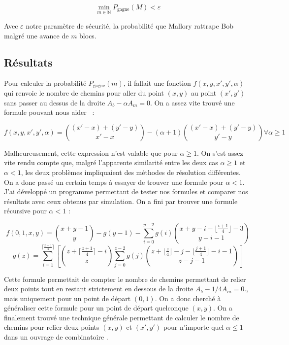 	\begin{equation}\label{eq:min-m}
		\min_{m \in \mathbb{N}} P_{\text{gagne}}(M) < \varepsilon
	\end{equation}

	Avec $\varepsilon$ notre paramètre de sécurité, la probabilité que Mallory
	rattrape Bob malgré une avance de $m$ blocs. 


	\subsection{Résultats}\label{subsec:walk-resultats}

	Pour calculer la probabilité $P_{\text{gagne}}(m)$, il fallait une fonction
	$f(x,y,x',y', \alpha)$ qui renvoie le nombre de chemins pour aller du point
	$(x,y)$ au point $(x',y')$ sans passer au dessus de la droite $A_b - \alpha
	A_m = 0$. On a assez vite trouvé une formule pouvant nous
	aider~\cite{combinatoire} :

	\begin{equation}\label{eq:f-simple}
		f(x,y,x',y', \alpha) = 
			\binom{(x'-x)+(y'-y)}{x'-x} -
			(\alpha + 1)\binom{(x'-x)+(y'-y)}{y'-y} 
		\forall \alpha \geq 1
	\end{equation}

	Malheureusement, cette expression n'est valable que pour $\alpha \geq 1$. On
	s'est assez vite rendu compte que, malgré l'apparente similarité entre les
	deux cas $\alpha \geq 1$ et $\alpha < 1$, les deux problèmes impliquaient des
	méthodes de résolution différentes. On a donc passé un certain temps à essayer
	de trouver une formule pour $\alpha < 1$. J'ai développé un programme
	permettant de tester nos formules et comparer nos résultats avec ceux obtenus
	par simulation. On a fini par trouver une formule récursive pour $\alpha < 1$
	:

	\begin{equation} 
		f(0,1,x,y) = 
		\binom{x+y-1}{y} - g(y-1) - \sum_{i=0}^{y-2}
		{g(i)\binom{x+y-i-\lfloor{\frac{i+1}{4}\rfloor}-3}
		{y-i-1}}
	\end{equation}
	\vspace{0.3cm}
	\begin{equation}
		g(z) = 
		\sum_{i=1}^{\lceil\frac{z+1}{4}\rceil}
		\left[
			\binom{z+\lceil\frac{z+1}{4}\rceil-i}{z}
			\sum_{j=0}^{z-2}g(j)
			\binom{z+\lfloor\frac{z}{4}\rfloor - j - \lfloor\frac{j+1}
			{4}\rfloor-i-1}{z-j-1}
		\right]
	\end{equation}

	Cette formule permettait de compter le nombre de chemins permettant de relier
	deux points tout en restant strictement en dessous de la droite $A_b - 1/4 A_m
	= 0$., mais uniquement pour un point de départ $(0,1)$. On a donc cherché à
	généraliser cette formule pour un point de départ quelconque $(x,y)$. On a
	finalement trouvé une technique générale permettant de calculer le nombre de
	chemins pour relier deux points $(x,y)$ et $(x',y')$ pour n'importe quel
	$\alpha \leq 1$ dans un ouvrage de combinatoire \cite{combinatoire}.

